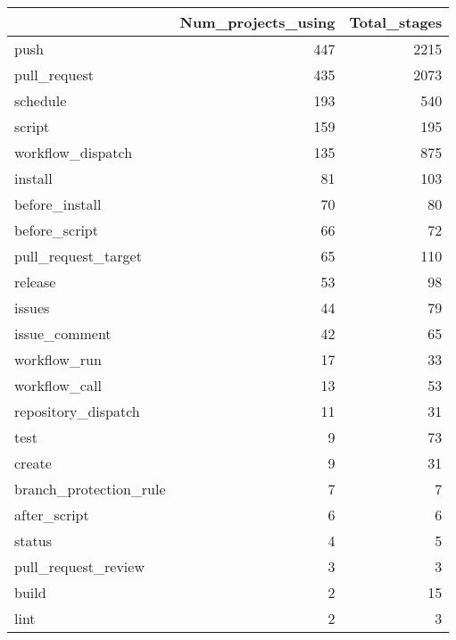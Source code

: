 \begin{tabular}{lrr}
\toprule
{} &  Num\_projects\_using &  Total\_stages \\
\midrule
push                        &                 447 &          2215 \\
pull\_request                &                 435 &          2073 \\
schedule                    &                 193 &           540 \\
script                      &                 159 &           195 \\
workflow\_dispatch           &                 135 &           875 \\
install                     &                  81 &           103 \\
before\_install              &                  70 &            80 \\
before\_script               &                  66 &            72 \\
pull\_request\_target         &                  65 &           110 \\
release                     &                  53 &            98 \\
issues                      &                  44 &            79 \\
issue\_comment               &                  42 &            65 \\
workflow\_run                &                  17 &            33 \\
workflow\_call               &                  13 &            53 \\
repository\_dispatch         &                  11 &            31 \\
test                        &                   9 &            73 \\
create                      &                   9 &            31 \\
branch\_protection\_rule      &                   7 &             7 \\
after\_script                &                   6 &             6 \\
status                      &                   4 &             5 \\
pull\_request\_review         &                   3 &             3 \\
build                       &                   2 &            15 \\
lint                        &                   2 &             3 \\

\end{tabular}

